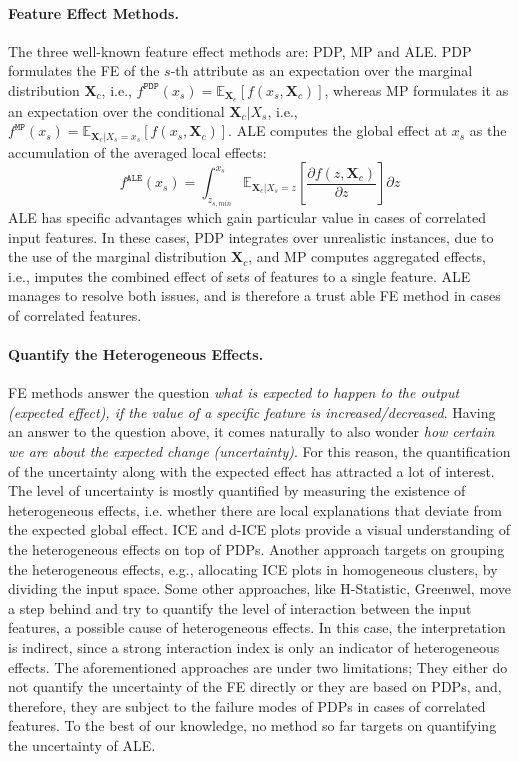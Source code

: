 \documentclass[twoside]{article}
\newcommand{\Xcb}{\mathbf{X}_c}
\begin{document}
\paragraph{Feature Effect Methods.} The three well-known feature
effect methods are: PDP, MP and ALE. PDP formulates the FE
of the \(s\)-th attribute as an expectation over the marginal
distribution \(\mathbf{X}_c\), i.e.,
\(f^{\mathtt{PDP}}(x_s) =
\mathbb{E}_{\mathbf{X}_c}[f(x_s,\mathbf{X}_c)]\), whereas MP
formulates it as an expectation over the conditional
\(\mathbf{X}_c|X_s\), i.e.,
\(f^{\mathtt{MP}}(x_s) = \mathbb{E}_{\mathbf{X}_c|X_s = x_s}[f(x_s,
\mathbf{X}_c)]\). ALE computes the global effect at \(x_s\) as the
accumulation of the averaged local effects:
\begin{equation}
  \label{eq:ALE_accumulated_mean}
  f^{\mathtt{ALE}}(x_s) = \int_{z_{s,min}}^{x_s} \mathbb{E}_{\Xcb|X_s=z}\left[\frac{\partial f(z, \Xcb)}{\partial z}\right] \partial z
\end{equation}
%
ALE has specific advantages which gain particular value in cases of
correlated input features. In these cases, PDP integrates over
unrealistic instances, due to the use of the marginal distribution
\(\mathbf{X}_c \), and MP computes aggregated effects, i.e., imputes
the combined effect of sets of features to a single feature. ALE
manages to resolve both issues, and is therefore a trust able FE method
in cases of correlated features.

\paragraph{Quantify the Heterogeneous Effects.}

FE methods answer the question \textit{what is expected to happen to
  the output (expected effect), if the value of a specific feature is
  increased/decreased}. Having an answer to the question above, it
comes naturally to also wonder \textit{how certain we are about the
  expected change (uncertainty)}. For this reason, the quantification
of the uncertainty along with the expected effect has attracted a lot
of interest. The level of uncertainty is mostly quantified by
measuring the existence of heterogeneous effects, i.e. whether there
are local explanations that deviate from the expected global
effect. ICE and d-ICE plots provide a visual understanding of the
heterogeneous effects on top of PDPs. Another approach targets on
grouping the heterogeneous effects, e.g., allocating ICE plots in
homogeneous clusters, by dividing the input
space.\citep{molnar2020model} Some other approaches, like H-Statistic,
Greenwel, move a step behind and try to quantify the level of
interaction between the input features, a possible cause of
heterogeneous effects. In this case, the interpretation is indirect,
since a strong interaction index is only an indicator of heterogeneous
effects. The aforementioned approaches are under two limitations; They
either do not quantify the uncertainty of the FE directly or they are
based on PDPs, and, therefore, they are subject to the failure modes
of PDPs in cases of correlated features. To the best of our knowledge,
no method so far targets on quantifying the uncertainty of ALE.
\end{document}
